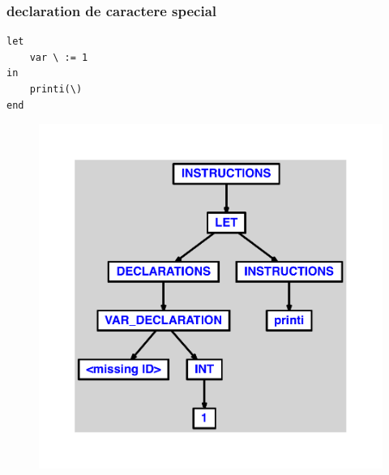 \documentclass{article}
\begin{document}
\subsubsection{declaration de caractere special}
\begin{lstlisting}
let
	var \ := 1
in
	printi(\)
end
\end{lstlisting}
\newpage
\begin{figure}[H]
\centering
\includegraphics[max width=\textwidth]{ast/ast_297.pdf}
\end{figure}
\newpage
\end{document}
